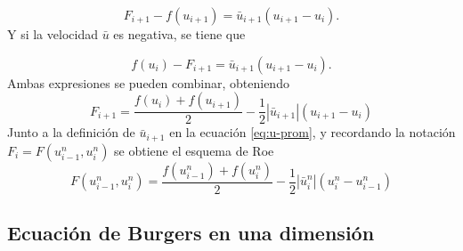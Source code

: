 \documentclass[12pt]{article}
\begin{document}
	\begin{equation}
		F_{i+1} - f(u_{i+1}) = \bar{u}_{i+1} (u_{i+1}-u_{i}).
	\end{equation}
	Y si la velocidad $\bar{u}$ es negativa, se tiene que
	
	\begin{equation}
		f(u_{i}) - F_{i+1} = \bar{u}_{i+1} (u_{i+1}-u_{i}).
	\end{equation}
	Ambas expresiones se pueden combinar, obteniendo
	\begin{equation}
		F_{i+1} = \frac{f(u_{i}) + f(u_{i+1})}{2} - \frac{1}{2}\left|\bar{u}_{i+1}\right|(u_{i+1}-u_{i})
	\end{equation}
	Junto a la definición de $\bar{u}_{i+1}$ en la ecuación \ref{eq:u-prom}, y recordando la notación $F_i = F(u_{i-1}^{n}, u_{i}^{n})$ se obtiene el esquema de Roe
	\begin{equation}
		\boxed{F(u_{i-1}^{n}, u_{i}^{n}) = \frac{f(u_{i-1}^{n}) + f(u_{i}^{n})}{2} - \frac{1}{2}\left|\bar{u}_{i}^{n}\right|(u_{i}^{n}-u_{i-1}^{n})}
		\label{eq:flujo-roe}
	\end{equation}
	\clearpage
	\subsection{Ecuación de Burgers en una dimensión}
\end{document}
